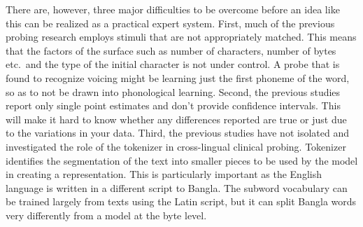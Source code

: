\documentclass[preprint,12pt]{elsarticle}
\begin{document}
There are, however, three major difficulties to be overcome before an idea like this can be realized as a practical expert system. First, much of the previous probing research employs stimuli that are not appropriately matched. This means that the factors of the surface such as number of characters, number of bytes etc.\ and the type of the initial character is not under control. A probe that is found to recognize voicing might be learning just the first phoneme of the word, so as to not be drawn into phonological learning.
Second, the previous studies report only single point estimates and don't provide confidence intervals. This will make it hard to know whether any differences reported are true or just due to the variations in your data.
Third, the previous studies have not isolated and investigated the role of the tokenizer in cross-lingual clinical probing. Tokenizer identifies the segmentation of the text into smaller pieces to be used by the model in creating a representation. This is particularly important as the English language is written in a different script to Bangla. The subword vocabulary can be trained largely from texts using the Latin script, but it can split Bangla words very differently from a model at the byte level.
\end{document}
